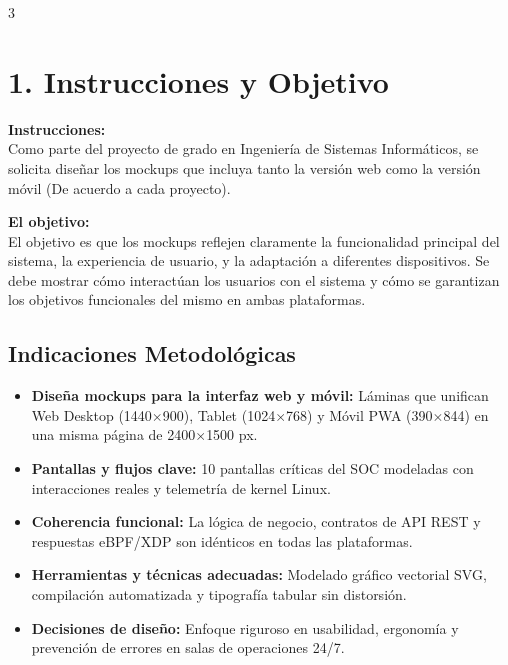 \documentclass[11pt]{article}
\begin{document}
\begin{multicols}{3}

\section*{\color{primary}\Large 1. Instrucciones y Objetivo}

\noindent\colorbox{boxbg}{%
\parbox{0.96\linewidth}{%
\textbf{\color{primary}Instrucciones:}\\[2bp]
\small\color{textsecondary} Como parte del proyecto de grado en Ingeniería de Sistemas Informáticos, se solicita diseñar los mockups que incluya tanto la versión web como la versión móvil (De acuerdo a cada proyecto).
}%
}

\vspace{6bp}

\noindent\colorbox{boxbg}{%
\parbox{0.96\linewidth}{%
\textbf{\color{primary}El objetivo:}\\[2bp]
\small\color{textsecondary} El objetivo es que los mockups reflejen claramente la funcionalidad principal del sistema, la experiencia de usuario, y la adaptación a diferentes dispositivos. Se debe mostrar cómo interactúan los usuarios con el sistema y cómo se garantizan los objetivos funcionales del mismo en ambas plataformas.
}%
}

\vspace{6bp}
\subsection*{\color{primarylight}Indicaciones Metodológicas}
\begin{itemize}[leftmargin=12bp, itemsep=2bp]
    \item \textbf{\color{textprimary}Diseña mockups para la interfaz web y móvil:} Láminas que unifican Web Desktop (1440$\times$900), Tablet (1024$\times$768) y Móvil PWA (390$\times$844) en una misma página de 2400$\times$1500 px.
    \item \textbf{\color{textprimary}Pantallas y flujos clave:} 10 pantallas críticas del SOC modeladas con interacciones reales y telemetría de kernel Linux.
    \item \textbf{\color{textprimary}Coherencia funcional:} La lógica de negocio, contratos de API REST y respuestas eBPF/XDP son idénticos en todas las plataformas.
    \item \textbf{\color{textprimary}Herramientas y técnicas adecuadas:} Modelado gráfico vectorial SVG, compilación automatizada y tipografía tabular sin distorsión.
    \item \textbf{\color{textprimary}Decisiones de diseño:} Enfoque riguroso en usabilidad, ergonomía y prevención de errores en salas de operaciones 24/7.
\end{itemize}


\end{multicols}
\end{document}
